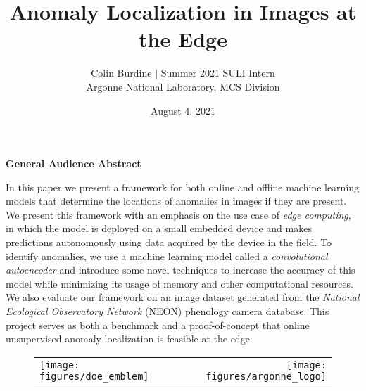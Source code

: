 \documentclass[12pt]{article}
\author{Colin Burdine $|$ Summer 2021 SULI Intern \\[6mm] Argonne National Laboratory, MCS Division}
\title{Anomaly Localization in Images at the Edge }
\date{August 4, 2021}
\begin{document}
\maketitle





\begin{center}\textbf{General Audience Abstract}\end{center}

In this paper we present a framework for both online and offline machine learning models that determine the locations of anomalies in images if they are present.  We present this framework with an emphasis on the use case of \textit{edge computing}, in which the model is deployed on a small embedded device and makes predictions autonomously using data acquired by the device in the field. To identify anomalies, we use a machine learning model called a \textit{convolutional autoencoder} and introduce some novel techniques to increase the accuracy of this model while minimizing its usage of memory and other computational resources. We also evaluate our framework on an image dataset generated from the \textit{National Ecological Observatory Network} (NEON) phenology camera database. This project serves as both a benchmark and a proof-of-concept that online unsupervised anomaly localization is feasible at the edge.

\begin{figure}
\begin{center}
\begin{tabular}{l r}
\texttt{[image: figures/doe\_emblem]} \qquad
& \qquad\texttt{[image: figures/argonne\_logo]} 
\end{tabular}
\end{center}
\end{figure}
\end{document}
